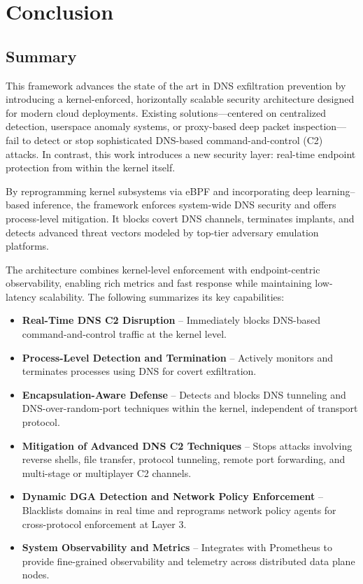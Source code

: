 \documentclass[letterpaper,twocolumn,10pt]{article}
\begin{document}
\section{Conclusion}
\label{sec:conclusion}

\subsection{Summary}
This framework advances the state of the art in DNS exfiltration prevention by introducing a kernel-enforced, horizontally scalable security architecture designed for modern cloud deployments. Existing solutions—centered on centralized detection, userspace anomaly systems, or proxy-based deep packet inspection—fail to detect or stop sophisticated DNS-based command-and-control (C2) attacks. In contrast, this work introduces a new security layer: real-time endpoint protection from within the kernel itself.

By reprogramming kernel subsystems via eBPF and incorporating deep learning–based inference, the framework enforces system-wide DNS security and offers process-level mitigation. It blocks covert DNS channels, terminates implants, and detects advanced threat vectors modeled by top-tier adversary emulation platforms.

The architecture combines kernel-level enforcement with endpoint-centric observability, enabling rich metrics and fast response while maintaining low-latency scalability. The following summarizes its key capabilities:

\begin{itemize}[nosep]
    \item \textbf{Real-Time DNS C2 Disruption} – Immediately blocks DNS-based command-and-control traffic at the kernel level.
    
    \item \textbf{Process-Level Detection and Termination} – Actively monitors and terminates processes using DNS for covert exfiltration.
    
    \item \textbf{Encapsulation-Aware Defense} – Detects and blocks DNS tunneling and DNS-over-random-port techniques within the kernel, independent of transport protocol.
    
    \item \textbf{Mitigation of Advanced DNS C2 Techniques} – Stops attacks involving reverse shells, file transfer, protocol tunneling, remote port forwarding, and multi-stage or multiplayer C2 channels.
    
    \item \textbf{Dynamic DGA Detection and Network Policy Enforcement} – Blacklists domains in real time and reprograms network policy agents for cross-protocol enforcement at Layer 3.
    
    \item \textbf{System Observability and Metrics} – Integrates with Prometheus to provide fine-grained observability and telemetry across distributed data plane nodes.
\end{itemize}
\end{document}
